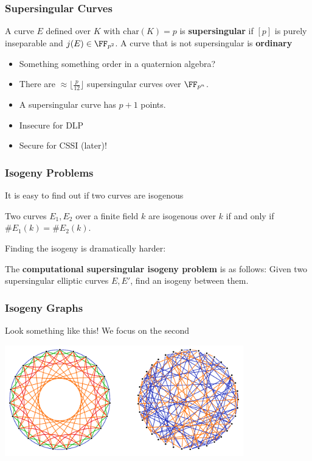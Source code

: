\documentclass{beamer}
\begin{document}
\begin{frame}
    \frametitle{Supersingular Curves}
    \begin{definition}
        A curve $E$ defined over $K$ with $\mathrm{char}(K) = p$ is \textbf{supersingular}
        if $[p]$ is purely inseparable and $j(E) \in \FF_{p^2}$. 
        A curve that is not supersingular is \textbf{ordinary}
    \end{definition}
    
    \begin{itemize}
        \item Something something order in a quaternion algebra?
        \item There are $\approx \lfloor \frac{p}{12} \rfloor$ supersingular curves over $\FF_{p^n}$.
        \item A supersingular curve has $p + 1$ points.
        \item Insecure for DLP
        \item Secure for CSSI (later)!
    \end{itemize}
    

\end{frame}

\begin{frame}
    \frametitle{Isogeny Problems}
    It is easy to find out if two curves are isogenous
    
    \begin{theorem}
        Two curves $E_1, E_2$ over a finite field $k$ are isogenous over $k$ if and only if $\#E_1(k) = \#E_2(k)$.
    \end{theorem}
    
   Finding the isogeny is dramatically harder:
   
   \begin{definition}
       The \textbf{computational supersingular isogeny problem} is as follows:
       Given two supersingular elliptic curves $E, E'$, find an isogeny between them. 
   \end{definition}
\end{frame}

\begin{frame}
    \frametitle{Isogeny Graphs}
    Look something like this! We focus on the second
    \begin{center}
        \includegraphics[width=28em]{isogeny_graph.PNG}
    \end{center}
\end{frame}
\end{document}

